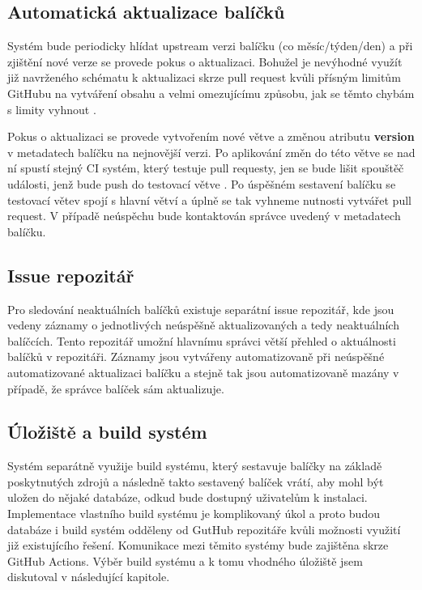 \documentclass[
  digital,     %
  oneside,     %
  nosansbold,  %
  nocolorbold, %
  lof,         %
  lot,         %
]{fithesis4}
\begin{document}
\subsection{Automatická aktualizace balíčků}

Systém bude periodicky hlídat upstream verzi balíčku (co měsíc/týden/den)
a při zjištění nové verze se provede pokus o aktualizaci. Bohužel je nevýhodné
využít již navrženého schématu k aktualizaci skrze pull request kvůli
přísným limitům GitHubu na vytváření obsahu \cite{gh_secondary_rate_limits}
a velmi omezujícímu způsobu, jak se těmto chybám s limity vyhnout
\cite{gh_avoid_secondary_rate_limits}.

Pokus o aktualizaci se provede vytvořením nové větve a změnou atributu
\textbf{version} v metadatech balíčku na nejnovější verzi. Po aplikování
změn do této větve se nad ní spustí stejný CI systém, který testuje pull
requesty, jen se bude lišit spouštěč události, jenž bude push do testovací
větve \cite{gh_push_trigger}. Po úspěšném sestavení balíčku se testovací 
větev spojí s hlavní větví a úplně se tak vyhneme nutnosti vytvářet pull
request. V případě neúspěchu bude kontaktován správce uvedený v metadatech
balíčku.


\subsection{Issue repozitář}

Pro sledování neaktuálních balíčků existuje separátní issue repozitář, kde
jsou vedeny záznamy o jednotlivých neúspěšně aktualizovaných a tedy neaktuálních
balíčcích. Tento repozitář umožní hlavnímu správci větší přehled o aktuálnosti
balíčků v repozitáři. Záznamy jsou vytvářeny automatizovaně při neúspěšné automatizované
aktualizaci balíčku a stejně tak jsou automatizovaně mazány v případě, že správce
balíček sám aktualizuje.


\subsection{Úložiště a build systém}

Systém separátně využije build systému, který sestavuje balíčky na základě
poskytnutých zdrojů a následně takto sestavený balíček vrátí, aby mohl být
uložen do nějaké databáze, odkud bude dostupný uživatelům k instalaci.
Implementace vlastního build systému je komplikovaný úkol a proto budou
databáze i build systém odděleny od GutHub repozitáře kvůli možnosti
využití již existujícího řešení. Komunikace mezi těmito systémy bude
zajištěna skrze GitHub Actions. Výběr build systému a k tomu vhodného
úložiště jsem diskutoval v následující kapitole.
\end{document}
